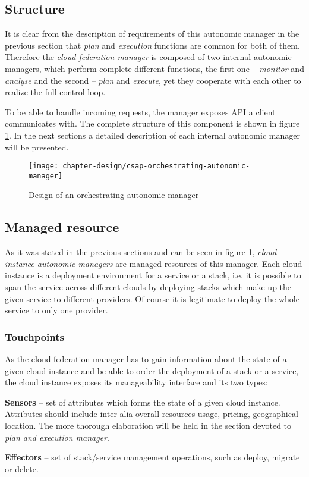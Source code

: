 \subsection{Structure}
It is clear from the description of requirements of this autonomic manager in the previous section that \emph{plan} and \emph{execution} functions are common for both of them. Therefore the \emph{cloud federation manager} is composed of two internal autonomic managers, which perform complete different functions, the first one -- \emph{monitor} and \emph{analyse} and the second -- \emph{plan} and \emph{execute}, yet they cooperate with each other to realize the full control loop.

To be able to handle incoming requests, the manager exposes API a client communicates with. The complete structure of this component is shown in figure \ref{img:orchestrating-autonomic-manager}. In the next sections a detailed description of each internal autonomic manager will be presented.

\begin{figure}[!ht]
  \begin{center}
    \texttt{[image: chapter-design/csap-orchestrating-autonomic-manager]}
  \end{center}
  \caption{Design of an orchestrating autonomic manager}
  \label{img:orchestrating-autonomic-manager}
\end{figure}

\subsection{Managed resource}
As it was stated in the previous sections and can be seen in figure \ref{img:orchestrating-autonomic-manager}, \emph{cloud instance autonomic managers} are managed resources of this manager. Each cloud instance is a deployment environment for a service or a stack, i.e. it is possible to span the service across different clouds by deploying stacks which make up the given service to different providers. Of course it is legitimate to deploy the whole service to only one provider.
\subsubsection*{Touchpoints}
As the cloud federation manager has to gain information about the state of a given cloud instance and be able to order the deployment of a stack or a service, the cloud instance exposes its manageability interface and its two types:
\begin{asparaenum}
\item[\textbf{Sensors}] -- set of attributes which forms the state of a given cloud instance. Attributes should include inter alia overall resources usage, pricing, geographical location. The more thorough elaboration will be held in the section devoted to \emph{plan and execution manager}.
\item[\textbf{Effectors}] -- set of stack/service management operations, such as deploy, migrate or delete.
\end{asparaenum}


